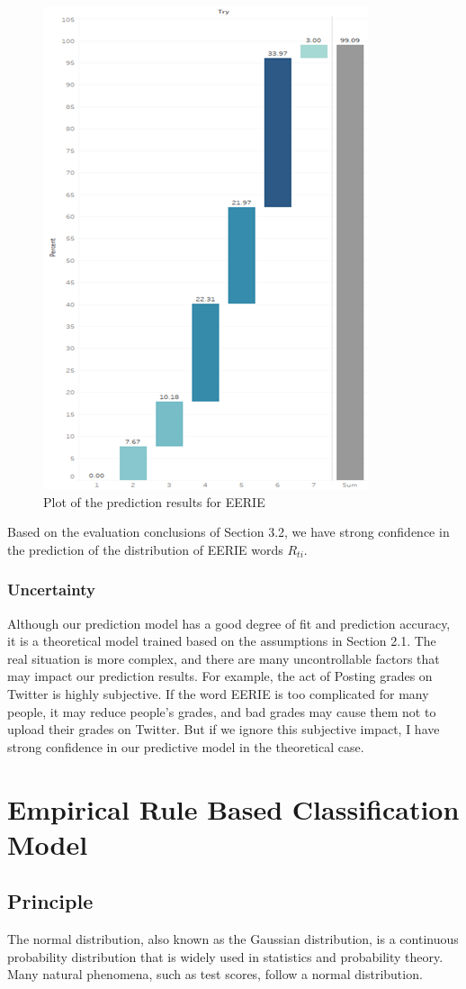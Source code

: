 \documentclass[12pt]{article}  %
\begin{document}
\begin{figure}[htbp]
\centering
\includegraphics[width=.3\textwidth]{img/predict.png}
\caption{Plot of the prediction results for EERIE}\label{fig:predict}
\end{figure}

Based on the evaluation conclusions of Section 3.2, we have strong confidence in the prediction of the distribution of EERIE words $R_{ti}$.

\subsubsection{ Uncertainty}
Although our prediction model has a good degree of fit and prediction accuracy, it is a theoretical model trained based on the assumptions in Section 2.1. The real situation is more complex, and there are many uncontrollable factors that may impact our prediction results. For example, the act of Posting grades on Twitter is highly subjective. If the word EERIE is too complicated for many people, it may reduce people's grades, and bad grades may cause them not to upload their grades on Twitter. But if we ignore this subjective impact, I have strong confidence in our predictive model in the theoretical case.



\section{Empirical Rule Based Classification Model}
\subsection{Principle}
The normal distribution, also known as the Gaussian distribution, is a continuous probability distribution that is widely used in statistics and probability theory. Many natural phenomena, such as test scores, follow a normal distribution.
\end{document}
